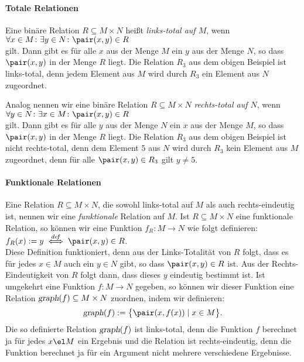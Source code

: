 \paragraph{Totale Relationen}
Eine bin\"{a}re Relation $R \subseteq M \times N$ heißt \emph{links-total auf $M$}, wenn \\[0.2cm]
\hspace*{1.3cm} $\forall x \in M \colon \exists y \in N \colon \pair(x,y) \in R$ \\[0.2cm]
gilt. Dann gibt es f\"{u}r alle $x$ aus der Menge $M$ ein $y$ aus der Menge $N$, so dass
$\pair(x,y)$ in der Menge  $R$ liegt.  Die Relation $R_3$ aus dem obigen Beispiel ist
links-total, denn jedem Element aus $M$ wird durch $R_3$ ein Element aus $N$ zugeordnet.

Analog nennen wir eine bin\"{a}re Relation $R \subseteq M \times N$  \emph{rechts-total auf $N$}, wenn \\[0.2cm]
\hspace*{1.3cm} $\forall y \in N \colon \exists x \in M \colon \pair(x,y) \in R$ \\[0.2cm]
gilt. Dann gibt es f\"{u}r alle $y$ aus der Menge $N$ ein $x$ aus der Menge $M$, so dass
$\pair(x,y)$ in der Menge  $R$ liegt.  Die Relation $R_3$ aus dem obigen Beispiel ist
nicht rechts-total, denn dem Element $5$ aus $N$ wird durch $R_3$ kein Element aus $M$
zugeordnet, denn f\"{u}r alle $\pair(x,y) \in R_3$ gilt $y \not= 5$.

\paragraph{Funktionale Relationen}
Eine Relation $R \subseteq M \times N$, die sowohl links-total auf $M$ als auch rechts-eindeutig
ist, nennen wir eine \emph{funktionale} Relation auf $M$.  Ist $R \subseteq M \times N$ eine
funktionale Relation, so k\"{o}nnen wir eine Funktion $f_R\colon M \rightarrow N$ wie folgt
definieren: \\[0.2cm]
\hspace*{1.3cm} $f_R(x) := y \;\stackrel{de\!f}{\Longleftrightarrow}\; \pair(x,y) \in R$. \\[0.2cm]
Diese Definition funktioniert, denn aus der Links-Totalit\"{a}t von $R$ folgt, dass es f\"{u}r
jedes $x\in M$ auch ein $y \in N$ gibt, so dass $\pair(x,y) \in R$ ist.  Aus der
Rechts-Eindeutigkeit von $R$ folgt dann, dass dieses $y$ eindeutig bestimmt ist.
Ist umgekehrt eine Funktion \mbox{$f:M \rightarrow N$} gegeben, so k\"{o}nnen wir dieser Funktion
eine Relation $\textsl{graph}(f) \subseteq M \times N$ zuordnen, indem wir definieren: 
\[ \textsl{graph}(f) := \bigl\{ \pair(x,f(x)) \mid  x\in M \bigr\}. \]
Die so definierte Relation $\textsl{graph}(f)$ ist links-total, denn die Funktion $f$
berechnet ja f\"{u}r jedes $x \el M$ ein Ergebnis und die Relation ist rechts-eindeutig,
denn die Funktion berechnet ja f\"{u}r ein Argument nicht mehrere verschiedene Ergebnisse.


